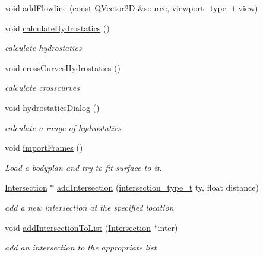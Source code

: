\begin{DoxyCompactItemize}
void \hyperlink{classShipCAD_1_1Controller_a2f990373fed61bd7b586883a5e211bad}{add\-Flowline} (const Q\-Vector2\-D \&source, \hyperlink{namespaceShipCAD_aeeeb05810f2e31ef89fd4ac6b6ba9c0a}{viewport\-\_\-type\-\_\-t} view)
\item 
void \hyperlink{classShipCAD_1_1Controller_a3b4ee09db0e5df18f9f5d58048156117}{calculate\-Hydrostatics} ()
\begin{DoxyCompactList}\small\item\em calculate hydrostatics \end{DoxyCompactList}\item 
void \hyperlink{classShipCAD_1_1Controller_a8e45334c9b25b8241ef4af126f6d5cc0}{cross\-Curves\-Hydrostatics} ()
\begin{DoxyCompactList}\small\item\em calculate crosscurves \end{DoxyCompactList}\item 
void \hyperlink{classShipCAD_1_1Controller_af3cb8f74ad629b252e41d18dd4eafaf5}{hydrostatics\-Dialog} ()
\begin{DoxyCompactList}\small\item\em calculate a range of hydrostatics \end{DoxyCompactList}\item 
void \hyperlink{classShipCAD_1_1Controller_a3006d50bf1be37732d602d452d7adf30}{import\-Frames} ()
\begin{DoxyCompactList}\small\item\em Load a bodyplan and try to fit surface to it. \end{DoxyCompactList}\item 
\hyperlink{classShipCAD_1_1Intersection}{Intersection} $\ast$ \hyperlink{classShipCAD_1_1Controller_ae9ca2e62f46b41b322e7f78349fa20bf}{add\-Intersection} (\hyperlink{namespaceShipCAD_aa56834b730aafdf2786ddc9a60a046fd}{intersection\-\_\-type\-\_\-t} ty, float distance)
\begin{DoxyCompactList}\small\item\em add a new intersection at the specified location \end{DoxyCompactList}\item 
void \hyperlink{classShipCAD_1_1Controller_a4be6dfd0fb455f3d30c728890464c977}{add\-Intersection\-To\-List} (\hyperlink{classShipCAD_1_1Intersection}{Intersection} $\ast$inter)
\begin{DoxyCompactList}\small\item\em add an intersection to the appropriate list \end{DoxyCompactList}\item 

\end{DoxyCompactItemize}
